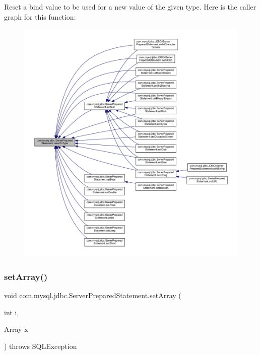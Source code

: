 Reset a bind value to be used for a new value of the given type. Here is the caller graph for this function\+:
\nopagebreak
\begin{figure}[H]
\begin{center}
\leavevmode
\includegraphics[width=350pt]{classcom_1_1mysql_1_1jdbc_1_1_server_prepared_statement_a9752e8c4db0cfe68dba1503bfffb9919_icgraph}
\end{center}
\end{figure}
\mbox{\label{classcom_1_1mysql_1_1jdbc_1_1_server_prepared_statement_a5b7edfa5f5447b3ff8d511f524021031}} 
\subsubsection{\texorpdfstring{set\+Array()}{setArray()}}
{\footnotesize\ttfamily void com.\+mysql.\+jdbc.\+Server\+Prepared\+Statement.\+set\+Array (\begin{DoxyParamCaption}\item[{int}]{i,  }\item[{Array}]{x }\end{DoxyParamCaption}) throws S\+Q\+L\+Exception}

